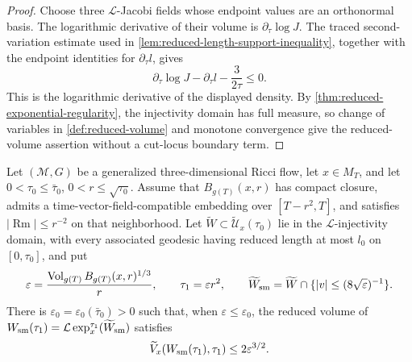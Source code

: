 \begin{proof}
Choose three $\mathcal L$-Jacobi fields whose endpoint values are an
orthonormal basis.  The logarithmic derivative of their volume is
$\partial_\tau\log J$.  The traced second-variation estimate used in
\ref{lem:reduced-length-support-inequality}, together with the endpoint
identities for $\partial_\tau l$, gives
\[
 \partial_\tau\log J-\partial_\tau l-\frac{3}{2\tau}\le0.
\]
This is the logarithmic derivative of the displayed density.  By
\ref{thm:reduced-exponential-regularity}, the injectivity domain has full
measure, so change of variables in \ref{def:reduced-volume} and monotone
convergence give the reduced-volume assertion without a cut-locus boundary
term.
\end{proof}

\begin{lemma}
\label{lem:generalized-noncollapsing-small-image}
\notready
Let $(\mathcal M,G)$ be a generalized three-dimensional Ricci flow, let
$x\in M_T$, and let $0<\tau_0\le\bar\tau_0$, $0<r\le\sqrt{\tau_0}$.
Assume that $B_{g(T)}(x,r)$ has compact closure, admits a
time-vector-field-compatible embedding over $[T-r^2,T]$, and satisfies
$|\operatorname{Rm}|\le r^{-2}$ on that neighborhood.  Let
$\widetilde W\subset\widetilde{\mathcal U}_x(\tau_0)$ lie in the
$\mathcal L$-injectivity domain, with every associated geodesic having
reduced length at most $l_0$ on $[0,\tau_0]$, and put
\[
 \varepsilon=\frac{\operatorname{Vol}_{g(T)}B_{g(T)}(x,r)^{1/3}}{r},
 \qquad \tau_1=\varepsilon r^2,
 \qquad \widetilde W_{\rm sm}=
 \widetilde W\cap\{|v|\le(8\sqrt\varepsilon)^{-1}\}.
\]
There is $\varepsilon_0=\varepsilon_0(\bar\tau_0)>0$ such that, when
$\varepsilon\le\varepsilon_0$, the reduced volume of
$W_{\rm sm}(\tau_1)=\mathcal L\exp_x^{\tau_1}(\widetilde W_{\rm sm})$ satisfies
\[
 \widetilde V_x(W_{\rm sm}(\tau_1),\tau_1)
 \le 2\varepsilon^{3/2}.
\]
\end{lemma}

